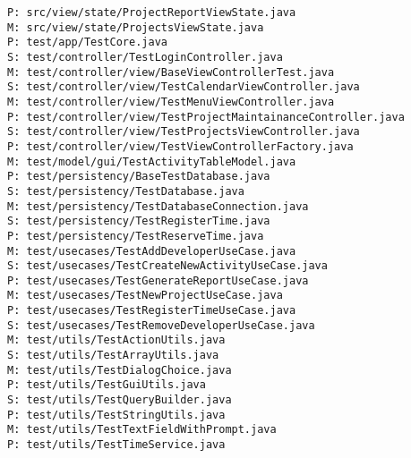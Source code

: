 \begin{verbatim}
P: src/view/state/ProjectReportViewState.java
M: src/view/state/ProjectsViewState.java
P: test/app/TestCore.java
S: test/controller/TestLoginController.java
M: test/controller/view/BaseViewControllerTest.java
S: test/controller/view/TestCalendarViewController.java
M: test/controller/view/TestMenuViewController.java
P: test/controller/view/TestProjectMaintainanceController.java
S: test/controller/view/TestProjectsViewController.java
P: test/controller/view/TestViewControllerFactory.java
M: test/model/gui/TestActivityTableModel.java
P: test/persistency/BaseTestDatabase.java
S: test/persistency/TestDatabase.java
M: test/persistency/TestDatabaseConnection.java
S: test/persistency/TestRegisterTime.java
P: test/persistency/TestReserveTime.java
M: test/usecases/TestAddDeveloperUseCase.java
S: test/usecases/TestCreateNewActivityUseCase.java
P: test/usecases/TestGenerateReportUseCase.java
M: test/usecases/TestNewProjectUseCase.java
P: test/usecases/TestRegisterTimeUseCase.java
S: test/usecases/TestRemoveDeveloperUseCase.java
M: test/utils/TestActionUtils.java
S: test/utils/TestArrayUtils.java
M: test/utils/TestDialogChoice.java
P: test/utils/TestGuiUtils.java
S: test/utils/TestQueryBuilder.java
P: test/utils/TestStringUtils.java
M: test/utils/TestTextFieldWithPrompt.java
P: test/utils/TestTimeService.java
\end{verbatim}